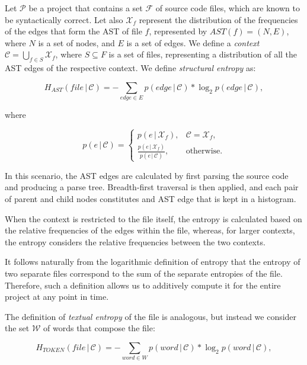 \documentclass[10pt,conference]{IEEEtran}
\begin{document}
Let $\mathcal{P}$ be a project that contains a set $\mathcal{F}$  of source code files, which are known to be syntactically correct. Let also $\mathcal{X}_{f}$ represent the distribution of the frequencies of the edges that form the AST of file $f$, represented by $AST(f) = (N, E)$, where $N$ is a set of nodes, and $E$ is a set of edges. We define a \textit{context} $\mathcal{C} = \bigcup_{f\in{S}}\mathcal{X}_{f}$, where $S\subseteq F$ is a set of files, representing a distribution of all the AST edges of the respective context. We define \textit{structural entropy} as:

\begin{equation*}
H_{AST}(file\,|\,\mathcal{C})= -\sum\limits_{edge \in E} p(edge\,|\,\mathcal{C})* \log_2 {p(edge\,|\,\mathcal{C})},
\tag{2}\end{equation*}

where

\begin{equation*}
{p(e\,|\,\mathcal{C})=
\begin{cases}
p(e\,|\,\mathcal{X}_{f}), & \mathcal{C} = \mathcal{X}_{f},\\
\frac{p(e\,|\,\mathcal{X}_{f})}{p(e\,|\,\mathcal{C})},& \text{otherwise.}
\end{cases}}
\end{equation*}

In this scenario, the AST edges are calculated by first parsing the source code and producing a parse tree. Breadth-first traversal is then applied, and each pair of parent and child nodes constitutes and AST edge that is kept in a histogram.

When the context is restricted to the file itself, the entropy is calculated based on the relative frequencies of the edges within the file, whereas, for larger contexts, the entropy considers the relative frequencies between the two contexts.

It follows naturally from the logarithmic definition of entropy that the entropy of two separate files correspond to the sum of the separate entropies of the file. Therefore, such a definition allows us to additively compute it for the entire project at any point in time.

The definition of \textit{textual entropy} of the file is analogous, but instead we consider the set $\mathcal{W}$ of words that compose the file:

\begin{equation*}
H_{TOKEN}(file\,|\,\mathcal{C})=-\sum\limits_{word \in W} p(word\,|\,\mathcal{C})* \log_2 {p(word\,|\,\mathcal{C})},
\tag{3}\end{equation*}
\end{document}
